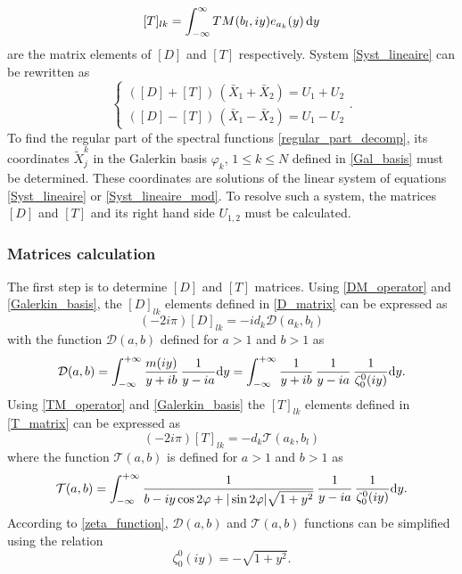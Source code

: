\begin{equation}
\label{T_matrix}
[T]_{lk} = \int_{-\infty}^\infty TM(b_l,iy) e_{a_k}(y) \, {\rm d} y
\end{equation}
are the matrix elements of $[D]$ and $[T]$ respectively. System \eqref{Syst_lineaire} can be rewritten as
\begin{equation}
\label{Syst_lineaire_mod}
\begin{cases}
([D] + [T]) \, (\bar{X}_1 + \bar{X}_2) = U_1 +  U_2\\
([D] - [T]) \, (\bar{X}_1 - \bar{X}_2) = U_1 - U_2
\end{cases}.
\end{equation}
To find the regular part of the spectral functions \eqref{regular_part_decomp}, its coordinates $\tilde{X}_j^k$ in the Galerkin basis $\varphi_k, \, 1 \leq k \leq N$ defined in \eqref{Gal_basis} must be determined. These coordinates are solutions of the linear system of equations \eqref{Syst_lineaire} or \eqref{Syst_lineaire_mod}. To resolve such a system, the matrices $[D]$ and $[T]$ and its right hand side $U_{1,2}$ must be calculated. 

\subsubsection*{Matrices calculation}
The first step is to determine $[D]$ and $[T]$ matrices.
Using \eqref{DM_operator} and \eqref{Galerkin_basis}, the $[D]_{lk}$ elements defined in \eqref{D_matrix} can be expressed as
\begin{equation}
\label{matrice_D}
(-2i\pi) [D]_{lk} =  -i d_k \mathcal{D}(a_k,b_l)
\end{equation}
with the function $\mathcal{D}(a,b)$ defined for $a>1$ and $b>1$ as
\begin{equation}
\label{ldbis}
\mathcal{D}(a,b) = \int_{-\infty}^{+\infty} \dfrac{m(iy)}{y + ib} \, \dfrac{1}{y -ia} {\rm d}y = \int_{-\infty}^{+\infty} \dfrac{1}{y + ib} \, \dfrac{1}{y -ia} \, \dfrac{1}{\zeta_0^0(iy)} {\rm d}y. 
\end{equation}
Using \eqref{TM_operator} and \eqref{Galerkin_basis} the $[T]_{lk}$ elements defined in \eqref{T_matrix} can be expressed as
\begin{equation}
\label{matrice_T}
(-2i\pi) [T]_{lk} =  - d_k \mathcal{T}(a_k,b_l)
\end{equation}
where the function $\mathcal{T}(a,b)$ is defined for $a>1$ and $b>1$ as
\begin{equation}
\label{ltbis}
\mathcal{T}(a,b) = \int_{-\infty}^{+\infty} \dfrac{1}{ b - iy \cos 2\varphi  + |\sin 2\varphi| \sqrt{1+y^2}} \, \dfrac{1}{y -i a} \, \dfrac{1}{\zeta_0^0(iy)} {\rm d} y . 
\end{equation}
According to \eqref{zeta_function}, $\mathcal{D}(a,b)$ and $\mathcal{T}(a,b)$ functions can be simplified using the relation
\begin{equation}
\zeta_0^0(iy)= - \sqrt{1+y^2}.
\end{equation}

